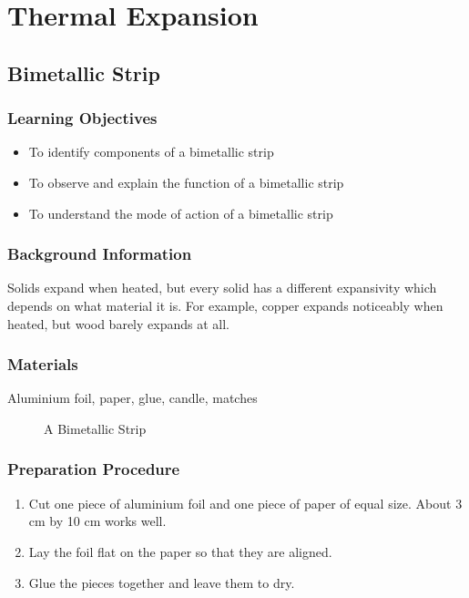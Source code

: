 \section{Thermal Expansion}

\subsection{Bimetallic Strip}

\subsubsection*{Learning Objectives}
\begin{itemize}
\item{To identify components of a bimetallic strip} 
\item{To observe and explain the function of a bimetallic strip} 
\item{To understand the mode of action of a bimetallic strip} 
\end{itemize}

\subsubsection*{Background Information}
Solids expand when heated, but every solid has a different expansivity which depends on what material it is. For example, copper expands noticeably when heated, but wood barely expands at all.  

\subsubsection*{Materials}
Aluminium foil, paper, glue, candle, matches

\begin{figure}
\begin{center}
\def\svgwidth{150pt}

\caption{A Bimetallic Strip}
\label{fig:bimetallic-strip}
\end{center}
\end{figure}

\subsubsection*{Preparation Procedure}
\begin{enumerate}
\item{Cut one piece of aluminium foil and one piece of paper of equal size. About 3 cm by 10 cm works well.} 
\item{Lay the foil flat on the paper so that they are aligned.} 
\item{Glue the pieces together and leave them to dry.} 
\end{enumerate}

